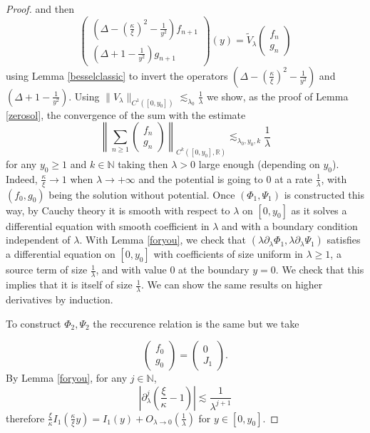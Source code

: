 \documentclass[11 pt]{amsart}
\theoremstyle{definition}
\theoremstyle{remark}
\numberwithin{equation}{section}
\begin{document}
\begin{proof}
  and then
  \[ \left(\begin{array}{c}
       \left( \Delta - \left( \frac{\kappa}{\xi} \right)^2 -
       \frac{1}{y^2} \right) f_{n + 1}\\
       \left( \Delta + 1 - \frac{1}{y^2} \right) g_{n + 1}
     \end{array}\right) (y) = \widetilde{V}_{\lambda} \left(\begin{array}{c}
       f_n\\
       g_n
     \end{array}\right) \]
  using Lemma \ref{besselclassic} to invert the operators $\left( \Delta -
  \left( \frac{\kappa}{\xi} \right)^2 - \frac{1}{y^2} \right)$
  and $\left( \Delta + 1 - \frac{1}{y^2} \right)$. Using $\| V_{\lambda}
  \|_{C^1 ([0, y_0])} \lesssim_{\lambda_0} \frac{1}{\lambda}$ we show, as the
  proof of Lemma \ref{zerosol}, the convergence of the sum with the estimate
  \[ \left\| \sum_{n \geqslant 1} \left(\begin{array}{c}
       f_n\\
       g_n
     \end{array}\right) \right\|_{C^k ([0, y_0], \mathbb{R})}
     \lesssim_{\lambda_0,y_0,k} \frac{1}{\lambda} \]
  for any $y_0 \geqslant 1$ and $k\in \mathbb N$ taking then $\lambda > 0$ large enough (depending
  on $y_0$). Indeed, $\frac{\kappa}{\xi} \rightarrow 1$ when $\lambda \rightarrow + \infty$ and the potential is going to $0$ at a rate $\frac{1}{\lambda}$, with $(f_0,g_0)$ being the solution without potential.
Once $(\Phi_1,\Psi_1)$ is constructed this way, by Cauchy theory it is smooth with respect to $\lambda$ on $[0,y_0]$ as it solves a differential equation with smooth coefficient in $\lambda$ and with a boundary condition independent of $\lambda$. With Lemma \ref{foryou}, we check that $(\lambda \partial_\lambda \Phi_1,\lambda \partial_\lambda \Psi_1)$ satisfies a differential equation on $[0,y_0]$ with coefficients of size uniform in $\lambda \geqslant 1$, a source term of size $\frac{1}{\lambda}$, and with value $0$ at the boundary $y=0$. We check that this implies that it is itself of size $\frac{1}{\lambda}$. We can show the same results on higher derivatives by induction.

  To construct $\Phi_2, \Psi_2$ the reccurence relation is the same
  but we take
  
  
  \[ \left(\begin{array}{c}
       f_0\\
       g_0
     \end{array}\right) = \left(\begin{array}{c}
       0\\
       J_1
     \end{array}\right) . \]
  By Lemma \ref{foryou}, for any $j \in \mathbb{N}$,
  \[ \left| \partial_{\lambda}^j \left( \frac{\xi}{\kappa} - 1
     \right) \right| \lesssim \frac{1}{\lambda^{j + 1}} \]
  therefore $\frac{\xi}{\kappa} I_1 \left(
  \frac{\kappa}{\xi} y \right) = I_1 (y) + O_{\lambda
  \rightarrow 0} \left( \frac{1}{\lambda} \right)$ for $y \in [0, y_0]$.
\end{proof}
\end{document}
